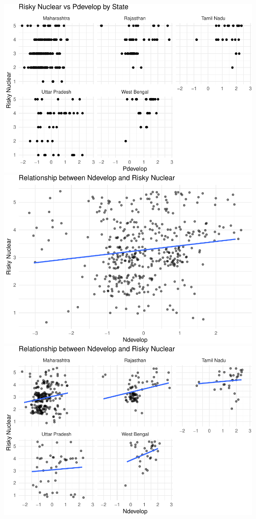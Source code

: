 \documentclass[
]{article}
\begin{document}
\includegraphics{Paper1_files/figure-latex/unnamed-chunk-30-2.pdf}
\includegraphics{Paper1_files/figure-latex/unnamed-chunk-30-3.pdf}
\includegraphics{Paper1_files/figure-latex/unnamed-chunk-30-4.pdf}
\end{document}
